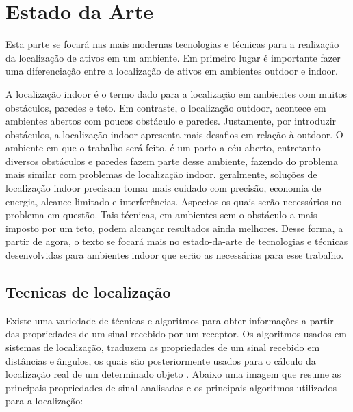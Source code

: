 \chapter{Estado da Arte}
Esta parte se focará nas mais modernas tecnologias e técnicas para a realização da localização de ativos em um ambiente. Em primeiro lugar é importante fazer uma diferenciação entre a localização de ativos em ambientes outdoor e indoor.

A localização indoor é o termo dado para a localização em ambientes com muitos obstáculos, paredes e teto. Em contraste, o localização outdoor, acontece em ambientes abertos com poucos obstáculo e paredes. Justamente, por introduzir obstáculos, a localização indoor apresenta mais desafios em relação à outdoor. O ambiente em que o trabalho será feito, é um porto a céu aberto, entretanto diversos obstáculos e paredes fazem parte desse ambiente, fazendo do problema mais similar com problemas de localização indoor. geralmente, soluções de localização indoor precisam tomar mais cuidado com precisão, economia de energia, alcance limitado e interferências. Aspectos os quais serão necessários no problema em questão. Tais técnicas, em ambientes sem o obstáculo a mais imposto por um teto, podem alcançar resultados ainda melhores. Desse forma, a partir de agora, o texto se focará mais no estado-da-arte de tecnologias e técnicas desenvolvidas para ambientes indoor que serão as necessárias para esse trabalho.

\section{Tecnicas de localização}
Existe uma variedade de técnicas e algoritmos para obter informações a partir das propriedades de um sinal recebido por um receptor. Os algoritmos usados em sistemas de localização, traduzem as propriedades de um sinal recebido em distâncias e ângulos, os quais são posteriormente usados para o cálculo da localização real de um determinado objeto \cite{art5}. Abaixo uma imagem que resume as principais propriedades de sinal analisadas e os principais algoritmos utilizados para a localização:

